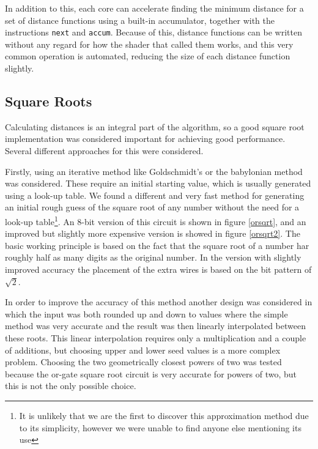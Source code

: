 			In addition to this, each core can accelerate finding the minimum 
			distance for a set of distance functions using a built-in 
			accumulator, together with the instructions \texttt{next} and 
			\texttt{accum}. Because of this, distance functions can be written
			without any regard for how the shader that called them works, and
			this very common operation is automated, reducing the size of each
			distance function slightly.

		\subsection{Square Roots}

			Calculating distances is an integral part of the algorithm, so a
			good square root implementation was considered important for
			achieving good performance. Several different approaches for this
			were considered.

			Firstly, using an iterative method like Goldschmidt's or the
			babylonian method was considered. These require an initial starting
			value, which is usually generated using a look-up table. We found a
			different and very fast method for generating an initial rough
			guess of the square root of any number without the need for a
			look-up table\footnote{It is unlikely that we are the first to
			discover this approximation method due to its simplicity, however
			we were unable to find anyone else mentioning its use}. An 8-bit
			version of this circuit is shown in figure \ref{orsqrt}, and an
			improved but slightly more expensive version is showed in figure
			\ref{orsqrt2}.  The basic working principle is based on the fact
			that the square root of a number har roughly half as many digits as
			the original number. In the version with slightly improved accuracy
			the placement of the extra wires is based on the bit pattern of
			$\sqrt{2}$.

			In order to improve the accuracy of this method another design was
			considered in which the input was both rounded up and down to 
			values where the simple method was very accurate and the result was
			then linearly interpolated between these roots. This linear 
			interpolation requires only a multiplication and a couple of 
			additions, but choosing upper and lower seed values is a more 
			complex problem. Choosing the two geometrically closest powers of 
			two was tested because the or-gate square root circuit is very
			accurate for powers of two, but this is not the only possible 
			choice.

